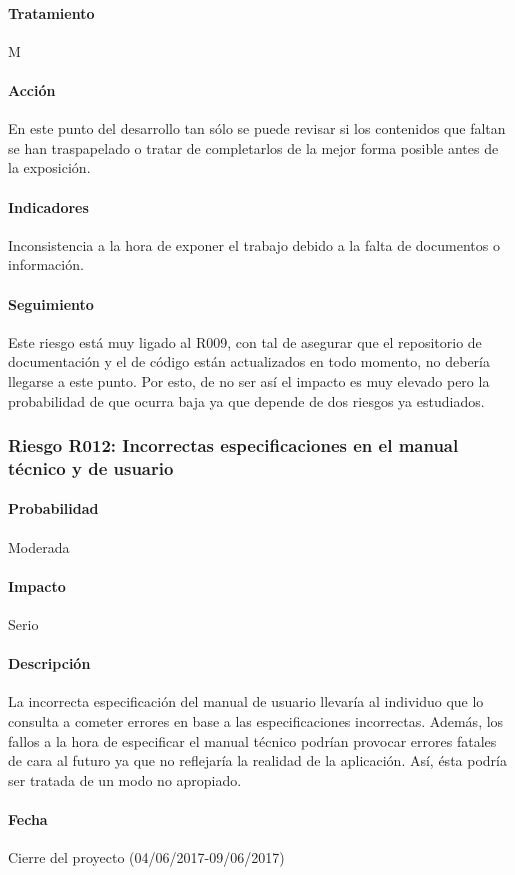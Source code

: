 \documentclass[10pt,a4paper]{article}
\begin{document}
				\paragraph{Tratamiento} M
				\paragraph{Acción} En este punto del desarrollo tan sólo se puede revisar si los contenidos que faltan se han traspapelado o tratar de completarlos de la mejor forma posible antes de la exposición.
				\paragraph{Indicadores} Inconsistencia a la hora de exponer el trabajo debido a la falta de documentos o información.
				\paragraph{Seguimiento}	Este riesgo está muy ligado al R009, con tal de asegurar que el repositorio de documentación y el de código están actualizados en todo momento, no debería llegarse a este punto. Por esto, de no ser así el impacto es muy elevado pero la probabilidad de que ocurra baja ya que depende de dos riesgos ya estudiados.			
				
				\subsubsection{Riesgo R012: Incorrectas especificaciones en el manual técnico y de usuario}
				\paragraph{Probabilidad} Moderada
				\paragraph{Impacto}	Serio
				\paragraph{Descripción} La incorrecta especificación del manual de usuario llevaría al individuo que lo consulta a cometer errores en base a las especificaciones incorrectas. Además, los fallos a la hora de especificar el manual técnico podrían provocar errores fatales de cara al futuro ya que no reflejaría la realidad de la aplicación. Así, ésta podría ser tratada de un modo no apropiado.
				\paragraph{Fecha} Cierre del proyecto (04/06/2017-09/06/2017)
\end{document}
